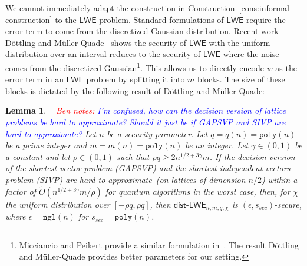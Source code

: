 \documentclass[11pt]{article}
\newcommand{\consref}[1]{\mbox{Construction~\ref{#1}}}
\newcommand{\class}[1]{{\ensuremath{\mathsf{#1}}}}
\newcommand{\rep}{\ensuremath{\class{Rep}}\xspace}
\newcommand{\vect}[1]{\ensuremath{\textbf{#1}}}
\newcommand{\poly}{\ensuremath{\mathtt{poly}}\xspace}
\newcommand{\ngl}{\ensuremath{\mathtt{ngl}}\xspace}
\newcommand{\LWE}{\class{LWE}}
\newcommand{\distLWE}{\ensuremath{\class{dist\mbox{-}LWE}}}
\newtheorem{lemma}[theorem]{Lemma}
\newcommand{\authnote}[2]{{\textcolor{red}{\textsf{#1 notes: }\textcolor{blue}{ #2}}\marginpar{\textcolor{red}{\textbf{!!!!!}}}}}
\newcommand{\authnote}[2]{}
\newcommand{\bnote}[1]{{\authnote{Ben}{#1}}}
\newcommand{\vA}{\vect{A}}
\begin{document}
We cannot immediately adapt the construction in \consref{cons:informal construction} to the $\LWE$ problem.  Standard formulations of $\LWE$ require the error term to come from the discretized Gaussian distribution.  
Recent work D\"{o}ttling and M\"{u}ller-Quade~\cite{dottling2012} shows the security of $\LWE$ with the uniform distribution over an interval reduces to the security of $\LWE$ where the noise comes from the discretized Gaussian\footnote{Micciancio and Peikert provide a similar formulation in~\cite{micciancio2013hardness}.  The result D\"{o}ttling and M\"{u}ller-Quade provides better parameters for our setting.}.  This allows us to directly encode $w$ as the error term in an $\LWE$ problem by splitting it  into $m$ blocks.  The size of these blocks is dictated by the following result of D\"{o}ttling and M\"{u}ller-Quade:

\begin{lemma}~
\label{lem:uniform LWE decision}
\bnote{I'm confused, how can the decision version of lattice problems be hard to approximate?  Should it just be if GAPSVP and SIVP are hard to approximate?}
Let $n$ be a security parameter.  Let $q = q(n) = \poly(n)$ be a prime integer and $m = m(n) = \poly(n)$ be an integer. Let $\gamma\in (0, 1)$ be a constant and let $\rho\in (0,1)$ such that $\rho q \geq 2n^{1/2+3\gamma}m$. If the decision-version of the shortest vector problem (GAPSVP) and the shortest independent vectors problem (SIVP) are hard to approximate~(on lattices of dimension $n/2$) within a factor of $\tilde{O}(n^{1/2+3\gamma}m/\rho)$ for quantum algorithms in the worst case, then, for $\chi$ the uniform distribution over $[-\rho q, \rho q]$, then $\distLWE_{n, m, q, \chi}$ is $(\epsilon, s_{sec})\mbox{-}$secure, where $\epsilon = \ngl(n)$ for $s_{sec}=\poly(n)$.
\end{lemma}
\end{document}
